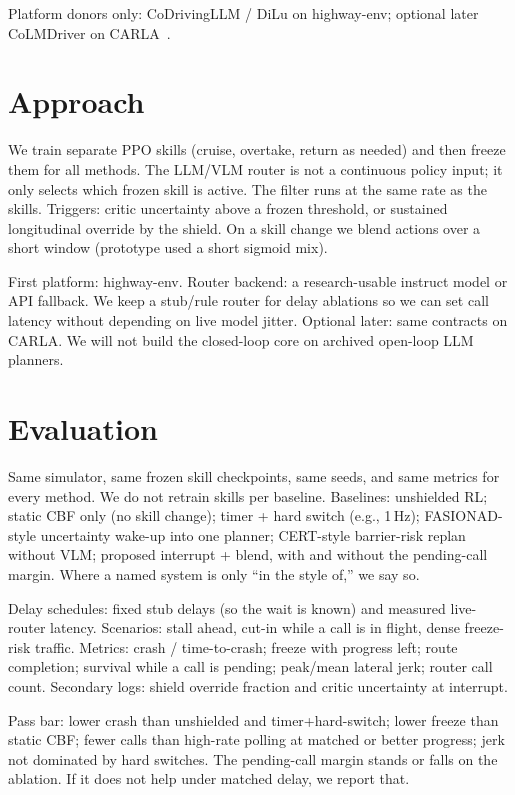 \documentclass[11pt]{article}
\begin{document}
Platform donors only: CoDrivingLLM / DiLu on highway-env; optional later CoLMDriver on CARLA~\citep{fang2024codrivingllm,wen2024dilu,liu2025colmdriver}.

\section{Approach}
We train separate PPO skills (cruise, overtake, return as needed) and then freeze them for all methods. The LLM/VLM router is not a continuous policy input; it only selects which frozen skill is active. The filter runs at the same rate as the skills. Triggers: critic uncertainty above a frozen threshold, or sustained longitudinal override by the shield. On a skill change we blend actions over a short window (prototype used a short sigmoid mix).

First platform: highway-env. Router backend: a research-usable instruct model or API fallback. We keep a stub/rule router for delay ablations so we can set call latency without depending on live model jitter. Optional later: same contracts on CARLA. We will not build the closed-loop core on archived open-loop LLM planners.

\section{Evaluation}
Same simulator, same frozen skill checkpoints, same seeds, and same metrics for every method. We do not retrain skills per baseline. Baselines: unshielded RL; static CBF only (no skill change); timer + hard switch (e.g., 1\,Hz); FASIONAD-style uncertainty wake-up into one planner; CERT-style barrier-risk replan without VLM; proposed interrupt + blend, with and without the pending-call margin. Where a named system is only ``in the style of,'' we say so.

Delay schedules: fixed stub delays (so the wait is known) and measured live-router latency. Scenarios: stall ahead, cut-in while a call is in flight, dense freeze-risk traffic. Metrics: crash / time-to-crash; freeze with progress left; route completion; survival while a call is pending; peak/mean lateral jerk; router call count. Secondary logs: shield override fraction and critic uncertainty at interrupt.

Pass bar: lower crash than unshielded and timer+hard-switch; lower freeze than static CBF; fewer calls than high-rate polling at matched or better progress; jerk not dominated by hard switches. The pending-call margin stands or falls on the ablation. If it does not help under matched delay, we report that.
\end{document}
